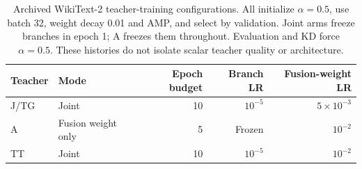 \begin{table}[htbp]\centering\small
\begin{tabular}{llrrr}
\toprule
Teacher & Mode & Epoch budget & Branch LR & Fusion-weight LR\\
\midrule
J/TG & Joint & 10 & $10^{-5}$ & $5\times10^{-3}$\\
A & Fusion weight only & 5 & Frozen & $10^{-2}$\\
TT & Joint & 10 & $10^{-5}$ & $10^{-2}$\\
\bottomrule
\end{tabular}
\caption{Archived WikiText-2 teacher-training configurations. All initialize $\alpha=0.5$, use batch 32, weight decay 0.01 and AMP, and select by validation. Joint arms freeze branches in epoch 1; A freezes them throughout. Evaluation and KD force $\alpha=0.5$. These histories do not isolate scalar teacher quality or architecture.}
\label{tab:teacher_training_protocol}
\end{table}
